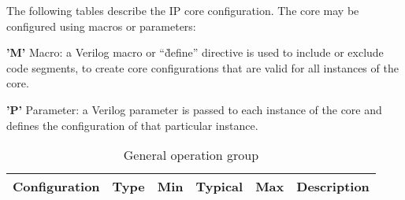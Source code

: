 
The following tables describe the IP core configuration. The core may be configured using macros or parameters:

\begin{description}
\item \textbf{'M'} Macro: a Verilog macro or ``\`define'' directive is used to include or exclude code segments, to create core configurations that are valid for all instances of the core.
\item \textbf{'P'} Parameter: a Verilog parameter is passed to each instance of the core and defines the configuration of that particular instance.
\end{description}

\begin{table}[H]
  \centering
  \begin{tabularx}{\textwidth}{|l|c|c|c|c|X|}

    \hline
    \rowcolor{iob-green}
    {\bf Configuration} & {\bf Type} & {\bf Min} & {\bf Typical} & {\bf Max} & {\bf Description} \\ \hline \hline

    

  \end{tabularx}
  \caption{General operation group}
  \label{general_operation_confs_tab:is}
\end{table}
\clearpage